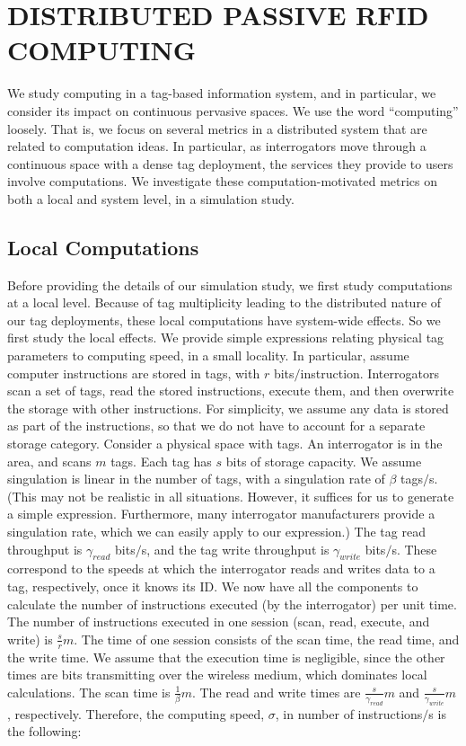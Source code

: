 \chapter{DISTRIBUTED PASSIVE RFID COMPUTING}
\label{Section: Distributed Passive RFID Computing}
We study computing in a tag-based information system, and in particular, we consider its impact on continuous pervasive spaces. We use the word ``computing'' loosely. That is, we focus on several metrics in a distributed system that are related to computation ideas. In particular, as interrogators move through a continuous space with a dense tag deployment, the services they provide to users involve computations. We investigate these computation-motivated metrics on both a local and system level, in a simulation study.

\section{Local Computations}
\label{Section: Distributed Passive Computing: Local Computations}
Before providing the details of our simulation study, we first study computations at a local level. Because of tag multiplicity leading to the distributed nature of our tag deployments, these local computations have system-wide effects. So we first study the local effects. We provide simple expressions relating physical tag parameters to computing speed, in a small locality. In particular, assume computer instructions are stored in tags, with $r$ bits$/$instruction. Interrogators scan a set of tags, read the stored instructions, execute them, and then overwrite the storage with other instructions. For simplicity, we assume any data is stored as part of the instructions, so that we do not have to account for a separate storage category. Consider a physical space with tags. An interrogator is in the area, and scans $m$ tags. Each tag has $s$ bits of storage capacity. We assume singulation is linear in the number of tags, with a singulation rate of $\beta$ tags$/$s. (This may not be realistic in all situations. However, it suffices for us to generate a simple expression. Furthermore, many interrogator manufacturers provide a singulation rate, which we can easily apply to our expression.) The tag read throughput is $\gamma_{read}$ bits$/$s, and the tag write throughput is $\gamma_{write}$ bits$/$s. These correspond to the speeds at which the interrogator reads and writes data to a tag, respectively, once it knows its ID. We now have all the components to calculate the number of instructions executed (by the interrogator) per unit time. The number of instructions executed in one session (scan, read, execute, and write) is $\frac{s}{r}m$. The time of one session consists of the scan time, the read time, and the write time. We assume that the execution time is negligible, since the other times are bits transmitting over the wireless medium, which dominates local calculations. The scan time is $\frac{1}{\beta} m$. The read and write times are $\frac{s}{\gamma_{read}}m$ and $\frac{s}{\gamma_{write}}m$, respectively. Therefore, the computing speed, $\sigma$, in number of instructions$/$s is the following:
